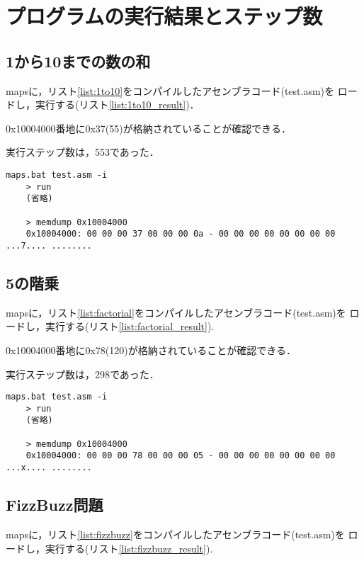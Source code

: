 \documentclass[11pt]{jarticle}
\begin{document}
\section{プログラムの実行結果とステップ数}

\subsection{1から10までの数の和}

mapsに，リスト\ref{list:1to10}をコンパイルしたアセンブラコード(test.asm)を
ロードし，実行する(リスト\ref{list:1to10_result})．

0x10004000番地に0x37(55)が格納されていることが確認できる．

実行ステップ数は，553であった．

\begin{lstlisting}[caption=1から10の和の結果,label=list:1to10_result]
    maps.bat test.asm -i
    > run
    (省略)

    > memdump 0x10004000
    0x10004000: 00 00 00 37 00 00 00 0a - 00 00 00 00 00 00 00 00  ...7.... ........
\end{lstlisting}

\subsection{5の階乗}

mapsに，リスト\ref{list:factorial}をコンパイルしたアセンブラコード(test.asm)を
ロードし，実行する(リスト\ref{list:factorial_result}).

0x10004000番地に0x78(120)が格納されていることが確認できる．

実行ステップ数は，298であった．

\begin{lstlisting}[caption=5の階乗の結果,label=list:factorial_result]
    maps.bat test.asm -i
    > run
    (省略)

    > memdump 0x10004000
    0x10004000: 00 00 00 78 00 00 00 05 - 00 00 00 00 00 00 00 00  ...x.... ........
\end{lstlisting}

\subsection{FizzBuzz問題}

mapsに，リスト\ref{list:fizzbuzz}をコンパイルしたアセンブラコード(test.asm)を
ロードし，実行する(リスト\ref{list:fizzbuzz_result}).
\end{document}
